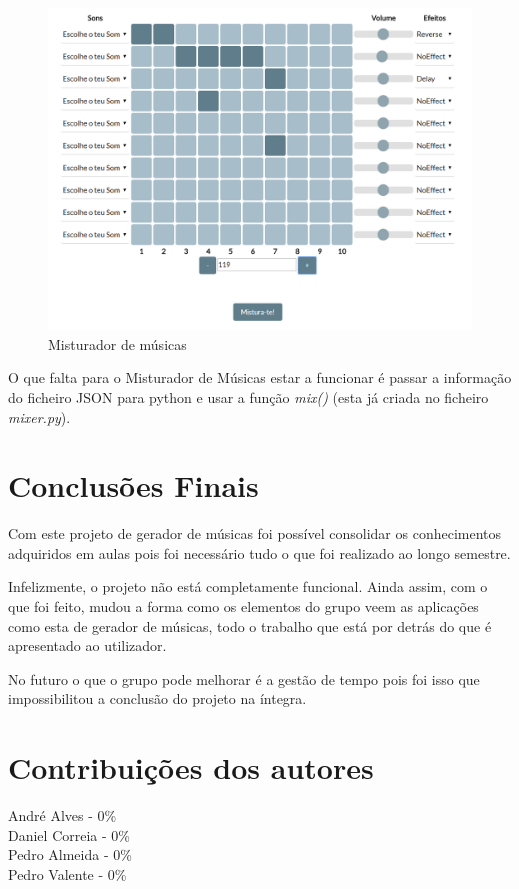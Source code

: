 \documentclass{report}
\begin{document}
	\begin{figure} [h]
		\centering
		\includegraphics[scale=0.5]{img/misturador.PNG}
		\caption{Misturador de músicas}
	\end{figure}

O que falta para o Misturador de Músicas estar a funcionar é passar a informação do ficheiro JSON para python e usar a função \textit{mix()} (esta já criada no ficheiro \textit{mixer.py}).

	 
\chapter{Conclusões Finais}
\label{chap.conclusao}
	Com este projeto de gerador de músicas foi possível consolidar os conhecimentos adquiridos em aulas pois foi necessário tudo o que foi realizado ao longo semestre. 
	
	Infelizmente, o projeto não está completamente funcional. Ainda assim, com o que foi feito, mudou a forma como os elementos do grupo veem as aplicações como esta de gerador de músicas, todo o trabalho que está por detrás do que é apresentado ao utilizador.  
	
	No futuro o que o grupo pode melhorar é a gestão de tempo pois foi isso que impossibilitou a conclusão do projeto na íntegra.


\chapter{Contribuições dos autores}
\label{contribuições}

\noindent
André Alves - 0\% \\
Daniel Correia - 0\% \\
Pedro Almeida - 0\% \\
Pedro Valente - 0\% 
\end{document}
